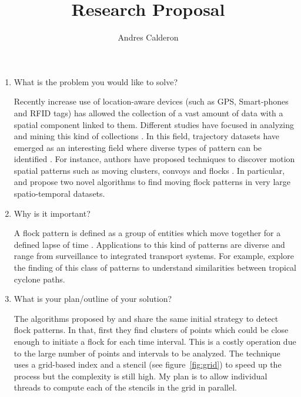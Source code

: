 \documentclass[a4paper, 12pt]{scrartcl}
\title{Research Proposal}
\author{Andres Calderon}
\begin{document}
\maketitle

\begin{enumerate}
 \item What is the problem you would like to solve?
 
Recently increase use of location-aware devices (such as GPS, Smart-phones and RFID tags) has allowed the collection of a vast amount of data with a spatial component linked to them.  Different studies have focused in analyzing and mining this kind of collections \citep{leung_knowledge_2010}\citep{Miller_2001}.  In this field, trajectory datasets have emerged as an interesting field where diverse types of pattern can be identified \citep{zheng_computing_2011}\citep{vieira_spatio-temporal_2013}.  For instance, authors have proposed techniques to discover motion spatial patterns such as moving clusters\citep{kalnis_discovering_2005}, convoys\citep{jeung_discovery_2008} and flocks \citep{benkert_reporting_2006}\citep{gudmundsson_computing_2006}.  In particular, \citep{vieira_-line_2009} and \citep{turdukulov_visual_2014} propose two novel algorithms to find moving flock patterns in very large spatio-temporal datasets.
 
 \item Why is it important?
 
A flock pattern is defined as a group of entities which move together for a defined lapse of time \citep{benkert_reporting_2006}.  Applications to this kind of patterns are diverse and range from surveillance to integrated transport systems.  For example, \citep{turdukulov_visual_2014} explore the finding of this class of patterns to understand similarities between tropical cyclone paths.  
 
 \item What is your plan/outline of your solution?
 
The algorithms proposed by \citep{vieira_-line_2009} and \citep{turdukulov_visual_2014} share the same initial strategy to detect flock patterns.  In that, first they find clusters of points which could be close enough to initiate a flock for each time interval.  This is a costly operation due to the large number of points and intervals to be analyzed.  The technique uses a grid-based index and a stencil (see figure~\ref{fig:grid}) to speed up the process but the complexity is still high.  My plan is to allow  individual threads to compute each of the stencils in the grid in parallel.


\end{enumerate}
\end{document}
